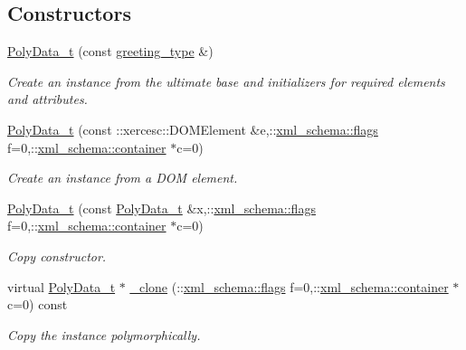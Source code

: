 \subsection*{Constructors}
\begin{DoxyCompactItemize}
\item 
\hyperlink{classPolyData__t_a4da6cc1205eee54feaebde53665f0621}{Poly\+Data\+\_\+t} (const \hyperlink{classPolyData__t_ae1f86bd7b6a37a0d0851de8a44627177}{greeting\+\_\+type} \&)
\begin{DoxyCompactList}\small\item\em Create an instance from the ultimate base and initializers for required elements and attributes. \end{DoxyCompactList}\item 
\hyperlink{classPolyData__t_a47b921cff0546cc9502c008a219d0058}{Poly\+Data\+\_\+t} (const \+::xercesc\+::\+D\+O\+M\+Element \&e,\+::\hyperlink{namespacexml__schema_a8d981c127a1f5106d04ad5853e707361}{xml\+\_\+schema\+::flags} f=0,\+::\hyperlink{namespacexml__schema_a395f5179c5fc4643909d66e9ff28d8ca}{xml\+\_\+schema\+::container} $\ast$c=0)
\begin{DoxyCompactList}\small\item\em Create an instance from a D\+O\+M element. \end{DoxyCompactList}\item 
\hyperlink{classPolyData__t_a6a0cccceec7668fe2f28776a4898a009}{Poly\+Data\+\_\+t} (const \hyperlink{classPolyData__t}{Poly\+Data\+\_\+t} \&x,\+::\hyperlink{namespacexml__schema_a8d981c127a1f5106d04ad5853e707361}{xml\+\_\+schema\+::flags} f=0,\+::\hyperlink{namespacexml__schema_a395f5179c5fc4643909d66e9ff28d8ca}{xml\+\_\+schema\+::container} $\ast$c=0)
\begin{DoxyCompactList}\small\item\em Copy constructor. \end{DoxyCompactList}\item 
virtual \hyperlink{classPolyData__t}{Poly\+Data\+\_\+t} $\ast$ \hyperlink{classPolyData__t_a90079722e663d849db7dec71493ddffe}{\+\_\+clone} (\+::\hyperlink{namespacexml__schema_a8d981c127a1f5106d04ad5853e707361}{xml\+\_\+schema\+::flags} f=0,\+::\hyperlink{namespacexml__schema_a395f5179c5fc4643909d66e9ff28d8ca}{xml\+\_\+schema\+::container} $\ast$c=0) const 
\begin{DoxyCompactList}\small\item\em Copy the instance polymorphically. \end{DoxyCompactList}\end{DoxyCompactItemize}


